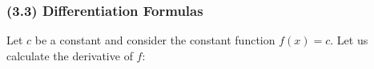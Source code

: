 \begin{frame}
\frametitle{(3.3) Differentiation Formulas}
Let $c$ be a constant and consider the constant function $f(x) = c$.  Let us calculate the derivative of $f$:
%
%
\end{frame}
